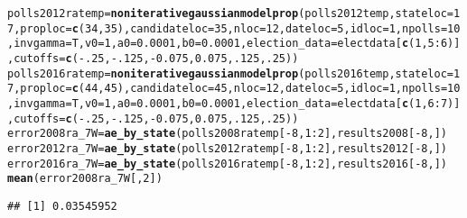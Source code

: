 \documentclass{article}\usepackage[]{graphicx}\usepackage[]{color}
\makeatletter
\newcommand{\hlnum}[1]{\textcolor[rgb]{0.686,0.059,0.569}{#1}}%
\newcommand{\hlopt}[1]{\textcolor[rgb]{0,0,0}{#1}}%
\newcommand{\hlstd}[1]{\textcolor[rgb]{0.345,0.345,0.345}{#1}}%
\newcommand{\hlkwb}[1]{\textcolor[rgb]{0.69,0.353,0.396}{#1}}%
\newcommand{\hlkwc}[1]{\textcolor[rgb]{0.333,0.667,0.333}{#1}}%
\newcommand{\hlkwd}[1]{\textcolor[rgb]{0.737,0.353,0.396}{\textbf{#1}}}%
\newenvironment{kframe}{%
 \def\at@end@of@kframe{}%
 \ifinner\ifhmode%
  \def\at@end@of@kframe{\end{minipage}}%
  \begin{minipage}{\columnwidth}%
 \fi\fi%
 \def\FrameCommand##1{\hskip\@totalleftmargin \hskip-\fboxsep
 \colorbox{shadecolor}{##1}\hskip-\fboxsep
     \hskip-\linewidth \hskip-\@totalleftmargin \hskip\columnwidth}%
 \MakeFramed {\advance\hsize-\width
   \@totalleftmargin\z@ \linewidth\hsize
   \@setminipage}}%
 {\par\unskip\endMakeFramed%
 \at@end@of@kframe}
\newenvironment{knitrout}{}{} %
\makeatother
\begin{document}
\begin{knitrout}
\begin{kframe}
\begin{alltt}
\hlstd{polls2012ratemp} \hlkwb{=} \hlkwd{noniterativegaussianmodelprop}\hlstd{(polls2012temp,} \hlkwc{stateloc} \hlstd{=} \hlnum{17}\hlstd{,} \hlkwc{proploc} \hlstd{=} \hlkwd{c}\hlstd{(}\hlnum{34}\hlstd{,} \hlnum{35}\hlstd{),} \hlkwc{candidateloc} \hlstd{=} \hlnum{35}\hlstd{,}  \hlkwc{nloc} \hlstd{=} \hlnum{12}\hlstd{,} \hlkwc{dateloc} \hlstd{=} \hlnum{5}\hlstd{,} \hlkwc{idloc} \hlstd{=} \hlnum{1}\hlstd{,}  \hlkwc{npolls} \hlstd{=} \hlnum{10}\hlstd{,}\hlkwc{invgamma} \hlstd{= T,} \hlkwc{v0}\hlstd{=}\hlnum{1}\hlstd{,} \hlkwc{a0}\hlstd{=}\hlnum{0.0001}\hlstd{,} \hlkwc{b0}\hlstd{=}\hlnum{0.0001}\hlstd{,}  \hlkwc{election_data} \hlstd{= electdata[}\hlkwd{c}\hlstd{(}\hlnum{1}\hlstd{,} \hlnum{5}\hlopt{:}\hlnum{6}\hlstd{)],} \hlkwc{cutoffs} \hlstd{=} \hlkwd{c}\hlstd{(}\hlopt{-}\hlnum{.25}\hlstd{,} \hlopt{-}\hlnum{.125}\hlstd{,} \hlopt{-}\hlnum{0.075}\hlstd{,} \hlnum{0.075}\hlstd{,} \hlnum{.125}\hlstd{,} \hlnum{.25}\hlstd{))}
\hlstd{polls2016ratemp} \hlkwb{=} \hlkwd{noniterativegaussianmodelprop}\hlstd{(polls2016temp,} \hlkwc{stateloc} \hlstd{=} \hlnum{17}\hlstd{,} \hlkwc{proploc} \hlstd{=} \hlkwd{c}\hlstd{(}\hlnum{44}\hlstd{,} \hlnum{45}\hlstd{),} \hlkwc{candidateloc} \hlstd{=} \hlnum{45}\hlstd{,} \hlkwc{nloc} \hlstd{=} \hlnum{12}\hlstd{,} \hlkwc{dateloc} \hlstd{=} \hlnum{5}\hlstd{,} \hlkwc{idloc} \hlstd{=} \hlnum{1}\hlstd{,}\hlkwc{npolls} \hlstd{=} \hlnum{10}\hlstd{,} \hlkwc{invgamma} \hlstd{= T,} \hlkwc{v0}\hlstd{=}\hlnum{1}\hlstd{,} \hlkwc{a0}\hlstd{=}\hlnum{0.0001}\hlstd{,} \hlkwc{b0}\hlstd{=}\hlnum{0.0001}\hlstd{,} \hlkwc{election_data} \hlstd{= electdata[}\hlkwd{c}\hlstd{(}\hlnum{1}\hlstd{,} \hlnum{6}\hlopt{:}\hlnum{7}\hlstd{)],} \hlkwc{cutoffs} \hlstd{=} \hlkwd{c}\hlstd{(}\hlopt{-}\hlnum{.25}\hlstd{,} \hlopt{-}\hlnum{.125}\hlstd{,} \hlopt{-}\hlnum{0.075}\hlstd{,} \hlnum{0.075}\hlstd{,} \hlnum{.125}\hlstd{,} \hlnum{.25}\hlstd{))}
\hlstd{error2008ra_7W} \hlkwb{=} \hlkwd{ae_by_state}\hlstd{(polls2008ratemp[}\hlopt{-}\hlnum{8}\hlstd{,} \hlnum{1}\hlopt{:}\hlnum{2}\hlstd{], results2008[}\hlopt{-}\hlnum{8}\hlstd{, ])}
\hlstd{error2012ra_7W} \hlkwb{=} \hlkwd{ae_by_state}\hlstd{(polls2012ratemp[}\hlopt{-}\hlnum{8}\hlstd{,} \hlnum{1}\hlopt{:}\hlnum{2}\hlstd{], results2012[}\hlopt{-}\hlnum{8}\hlstd{, ])}
\hlstd{error2016ra_7W} \hlkwb{=} \hlkwd{ae_by_state}\hlstd{(polls2016ratemp[}\hlopt{-}\hlnum{8}\hlstd{,} \hlnum{1}\hlopt{:}\hlnum{2}\hlstd{], results2016[}\hlopt{-}\hlnum{8}\hlstd{, ])}
\hlkwd{mean}\hlstd{(error2008ra_7W[,}\hlnum{2}\hlstd{])}
\end{alltt}
\begin{verbatim}
## [1] 0.03545952

\end{verbatim}
\end{kframe}
\end{knitrout}
\end{document}
